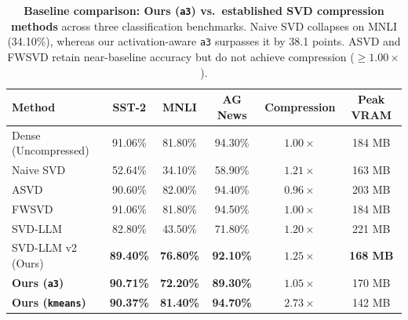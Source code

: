 \begin{table}[t]
\centering
\caption{\textbf{Baseline comparison: Ours (\texttt{a3}) vs.\ established SVD compression methods} across three classification benchmarks.
Naive SVD collapses on MNLI (34.10\%), whereas our activation-aware \texttt{a3} surpasses it by 38.1 points.
ASVD and FWSVD retain near-baseline accuracy but do not achieve compression ($\ge1.00\times$).}
\label{tab:baselines}
\small
\setlength{\tabcolsep}{5pt}
\begin{tabular}{lccc|cc}
\toprule
\textbf{Method} & \textbf{SST-2} & \textbf{MNLI} & \textbf{AG News} & \textbf{Compression} & \textbf{Peak VRAM} \\
\midrule
Dense (Uncompressed)  & 91.06\% & 81.80\% & 94.30\% & $1.00\times$ & 184 MB \\
Naive SVD             & 52.64\% & 34.10\% & 58.90\% & $1.21\times$ & 163 MB \\
ASVD                  & 90.60\% & 82.00\% & 94.40\% & $0.96\times$ & 203 MB \\
FWSVD                 & 91.06\% & 81.80\% & 94.50\% & $1.00\times$ & 184 MB \\
SVD-LLM               & 82.80\% & 43.50\% & 71.80\% & $1.20\times$ & 221 MB \\
SVD-LLM v2 (Ours)      & \textbf{89.40\%} & \textbf{76.80\%} & \textbf{92.10\%} & $\mathbf{1.25\times}$ & \textbf{168 MB} \\
\midrule
\textbf{Ours (\texttt{a3})}  & \textbf{90.71\%} & \textbf{72.20\%} & \textbf{89.30\%} & $1.05\times$ & 170 MB \\
\textbf{Ours (\texttt{kmeans})}  & \textbf{90.37\%} & \textbf{81.40\%} & \textbf{94.70\%} & $\mathbf{2.73\times}$ & 142 MB \\
\bottomrule
\end{tabular}
\end{table}
